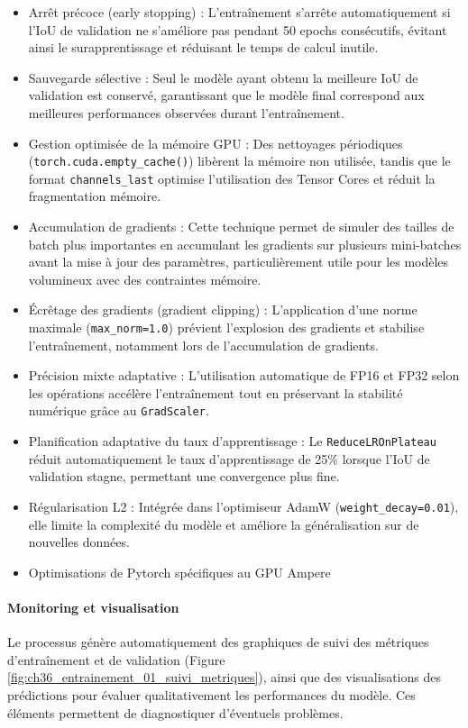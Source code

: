 \begin{itemize}
    \item Arrêt précoce (early stopping) : L'entraînement s'arrête automatiquement si l'IoU de validation ne s'améliore pas pendant 50 epochs consécutifs, évitant ainsi le surapprentissage et réduisant le temps de calcul inutile.
    \item Sauvegarde sélective : Seul le modèle ayant obtenu la meilleure IoU de validation est conservé, garantissant que le modèle final correspond aux meilleures performances observées durant l'entraînement.
    \item Gestion optimisée de la mémoire GPU : Des nettoyages périodiques (\texttt{torch.cuda.empty\_cache()}) libèrent la mémoire non utilisée, tandis que le format \texttt{channels\_last} optimise l'utilisation des Tensor Cores et réduit la fragmentation mémoire.
    \item Accumulation de gradients : Cette technique permet de simuler des tailles de batch plus importantes en accumulant les gradients sur plusieurs mini-batches avant la mise à jour des paramètres, particulièrement utile pour les modèles volumineux avec des contraintes mémoire.
    \item Écrêtage des gradients (gradient clipping) : L'application d'une norme maximale (\texttt{max\_norm=1.0}) prévient l'explosion des gradients et stabilise l'entraînement, notamment lors de l'accumulation de gradients.
    \item Précision mixte adaptative : L'utilisation automatique de FP16 et FP32 selon les opérations accélère l'entraînement tout en préservant la stabilité numérique grâce au \texttt{GradScaler}.
    \item Planification adaptative du taux d'apprentissage : Le \texttt{ReduceLROnPlateau} réduit automatiquement le taux d'apprentissage de 25\% lorsque l'IoU de validation stagne, permettant une convergence plus fine.
    \item Régularisation L2 : Intégrée dans l'optimiseur AdamW (\texttt{weight\_decay=0.01}), elle limite la complexité du modèle et améliore la généralisation sur de nouvelles données.
    \item Optimisations de Pytorch spécifiques au GPU Ampere
\end{itemize}

\paragraph{Monitoring et visualisation}
Le processus génère automatiquement des graphiques de suivi des métriques d'entraînement et de validation (Figure \ref{fig:ch36_entrainement_01_suivi_metriques}), ainsi que des visualisations des prédictions pour évaluer qualitativement les performances du modèle. Ces éléments permettent de diagnostiquer d'éventuels problèmes.

